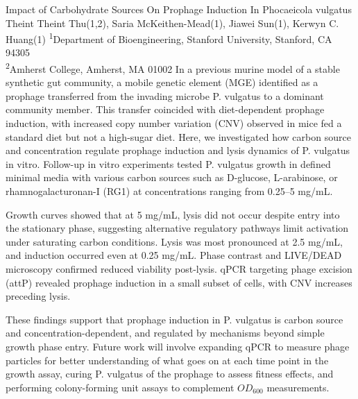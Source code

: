 \makeabstract
{
Impact of Carbohydrate Sources On Prophage Induction In Phocaeicola vulgatus
}
{
Theint Theint Thu(1,2), Saria McKeithen-Mead(1), Jiawei Sun(1), Kerwyn C. Huang(1)
}
{
\textsuperscript{1}Department of Bioengineering, Stanford University, Stanford, CA 94305\\
\textsuperscript{2}Amherst College, Amherst, MA 01002
}
{
In a previous murine model of a stable synthetic gut community, a mobile genetic element (MGE) identified as a prophage transferred from the invading microbe P. vulgatus to a dominant community member. This transfer coincided with diet-dependent prophage induction, with increased copy number variation (CNV) observed in mice fed a standard diet but not a high-sugar diet. Here, we investigated how carbon source and concentration regulate prophage induction and lysis dynamics of P. vulgatus in vitro.
}
{
Follow-up in vitro experiments tested P. vulgatus growth in defined minimal media with various carbon sources such as D-glucose, L-arabinose, or rhamnogalacturonan-I (RG1) at concentrations ranging from 0.25–5 mg/mL.
}
{
Growth curves showed that at 5 mg/mL, lysis did not occur despite entry into the stationary phase, suggesting alternative regulatory pathways limit activation under saturating carbon conditions. Lysis was most pronounced at 2.5 mg/mL, and induction occurred even at 0.25 mg/mL. Phase contrast and LIVE/DEAD microscopy confirmed reduced viability post-lysis. qPCR targeting phage excision (attP) revealed prophage induction in a small subset of cells, with CNV increases preceding lysis.

}
{
These findings support that prophage induction in P. vulgatus is carbon source and concentration-dependent, and regulated by mechanisms beyond simple growth phase entry. Future work will involve expanding qPCR to measure phage particles for better understanding of what goes on at each time point in the growth assay, curing P. vulgatus of the prophage to assess fitness effects, and performing colony-forming unit assays to complement $OD_{600}$ measurements.
}

\newpage
